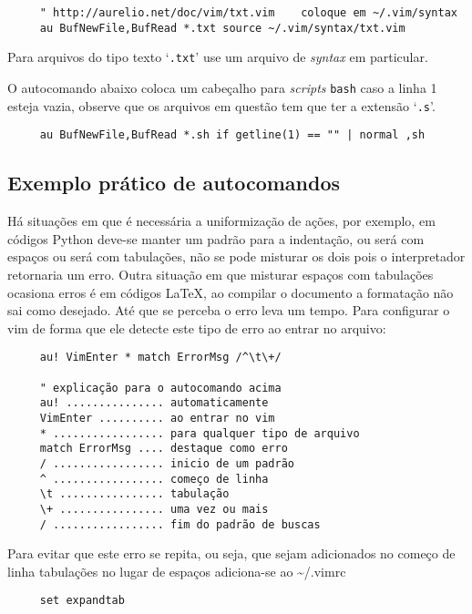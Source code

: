 \begin{verbatim}
     " http://aurelio.net/doc/vim/txt.vim    coloque em ~/.vim/syntax
     au BufNewFile,BufRead *.txt source ~/.vim/syntax/txt.vim
\end{verbatim}

Para arquivos do tipo texto `{\tt *.txt}' use um arquivo de {\em syntax} em
particular.

O autocomando abaixo coloca um cabeçalho para {\em scripts} {\tt bash} caso a
linha 1 esteja vazia, observe que os arquivos em questão tem que ter a
extensão `{\tt .s}'.

\begin{verbatim}
     au BufNewFile,BufRead *.sh if getline(1) == "" | normal ,sh
\end{verbatim}

\subsection{Exemplo prático de autocomandos}
\label{sub:Exemplo prático de autocomandos}

Há situações em que é necessária a uniformização de ações, por exemplo, em
códigos Python deve-se manter um padrão para a indentação, ou será com espaços
ou será com tabulações, não se pode misturar os dois pois o interpretador retornaria um erro.
Outra situação em que misturar espaços com tabulações ocasiona erros é em
códigos \LaTeX, ao compilar o documento a formatação não sai como desejado.
Até que se perceba o erro leva um tempo.  Para configurar o vim de forma que
ele detecte este tipo de erro ao entrar no arquivo:

\begin{verbatim}
     au! VimEnter * match ErrorMsg /^\t\+/

     " explicação para o autocomando acima
     au! ............... automaticamente
     VimEnter .......... ao entrar no vim
     * ................. para qualquer tipo de arquivo
     match ErrorMsg .... destaque como erro
     / ................. inicio de um padrão
     ^ ................. começo de linha
     \t ................ tabulação
     \+ ................ uma vez ou mais
     / ................. fim do padrão de buscas
\end{verbatim}

Para evitar que este erro se repita, ou seja, que sejam 
adicionados no começo de linha tabulações no lugar de espaços
adiciona-se ao \textasciitilde/.vimrc

\begin{verbatim}
     set expandtab
\end{verbatim}

